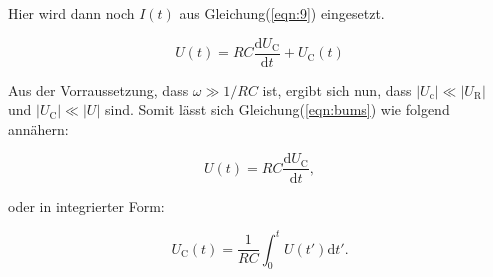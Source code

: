         \noindent  Hier wird dann noch $I(t)$ aus Gleichung(\ref{eqn:9}) eingesetzt.

        \begin{equation}
            U(t) = RC \frac{\text{d}U_{\text{C}}}{\text{d}t} + U_{\text{C}}(t)
            \label{eqn:bums}
        \end{equation}

        \noindent Aus der Vorraussetzung, dass $\omega \gg 1/RC $ ist, ergibt sich nun, dass $|U_{\text{c}}| \ll | U_{\text{R}}|$ und 
        $|U_{\text{C}}| \ll |U|$ sind. Somit lässt sich Gleichung(\ref{eqn:bums}) wie folgend annähern:

        \begin{equation*}
            U(t) = RC \frac{\text{d}U_{\text{C}}}{\text{d}t} ,
        \end{equation*}
        
        \noindent oder in integrierter Form:

        \begin{equation*}
            U_{\text{C}}(t) = \frac{1}{RC} \int_0^t U(t')\text{d}t' .
        \end{equation*}